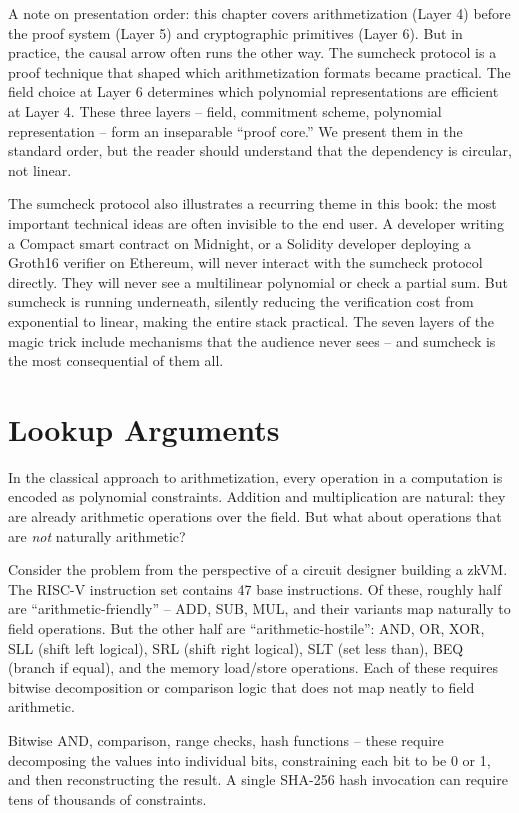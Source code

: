 \documentclass[
  11pt,
  openany]{report}
\begin{document}
A note on presentation order: this chapter covers arithmetization (Layer 4)
before the proof system (Layer 5) and cryptographic primitives (Layer 6). But in
practice, the causal arrow often runs the other way. The sumcheck protocol is a
proof technique that shaped which arithmetization formats became practical. The
field choice at Layer 6 determines which polynomial representations are
efficient at Layer 4. These three layers -- field, commitment scheme, polynomial
representation -- form an inseparable ``proof core.'' We present them in the
standard order, but the reader should understand that the dependency is
circular, not linear.

The sumcheck protocol also illustrates a recurring theme in this book: the most
important technical ideas are often invisible to the end user. A developer
writing a Compact smart contract on Midnight, or a Solidity developer deploying
a Groth16 verifier on Ethereum, will never interact with the sumcheck protocol
directly. They will never see a multilinear polynomial or check a partial sum.
But sumcheck is running underneath, silently reducing the verification cost from
exponential to linear, making the entire stack practical. The seven layers of
the magic trick include mechanisms that the audience never sees -- and sumcheck
is the most consequential of them all.

\section{Lookup Arguments}\label{lookup-arguments}

In the classical approach to arithmetization, every operation in a computation
is encoded as polynomial constraints. Addition and multiplication are natural:
they are already arithmetic operations over the field. But what about operations
that are \emph{not} naturally arithmetic?

Consider the problem from the perspective of a circuit designer building a zkVM.
The RISC-V instruction set contains 47 base instructions. Of these, roughly half
are ``arithmetic-friendly'' -- ADD, SUB, MUL, and their variants map naturally
to field operations. But the other half are ``arithmetic-hostile'': AND, OR,
XOR, SLL (shift left logical), SRL (shift right logical), SLT (set less than),
BEQ (branch if equal), and the memory load/store operations. Each of these
requires bitwise decomposition or comparison logic that does not map neatly to
field arithmetic.

Bitwise AND, comparison, range checks, hash functions -- these require
decomposing the values into individual bits, constraining each bit to be 0 or 1,
and then reconstructing the result. A single SHA-256 hash invocation can require
tens of thousands of constraints.
\end{document}
